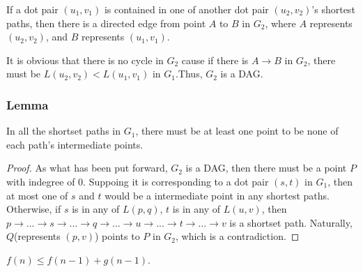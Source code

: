 \documentclass{elegantpaper}
\begin{document}
If a dot pair $(u_{1},v_{1})$ is contained in one of another dot pair $(u_{2},v_{2})$'s shortest paths, then there is a directed edge from point $A$ to $B$ in $G_{2}$, where $A$ represents $(u_{2},v_{2})$, and $B$ represents $(u_{1}, v_{1})$.

It is obvious that there is no cycle in $G_{2}$ cause if there is $A\rightarrow B$ in $G_{2}$, there must be $L(u_{2}, v_{2}) < L(u_{1}, v_{1})$ in $G_{1}$.Thus, $G_{2}$ is a DAG. 

\subsubsection{Lemma}
\begin{lemma} \quad In all the shortset paths in $G_{1}$, there must be at least one point to be none of each path's intermediate points.
\end{lemma}

\begin{proof} \quad As what has been put forward, $G_{2}$ is a DAG, then there must be a point $P$ with indegree of $0$. Suppoing it is corresponding to a dot pair $(s,t)$ in $G_{1}$, then at most one of $s$ and $t$ would be a intermediate point in any shortest paths. Otherwise, if $s$ is in any of $L(p,q)$, $t$ is in any of $L(u,v)$, then $p\rightarrow...\rightarrow s\rightarrow...\rightarrow q\rightarrow...\rightarrow u\rightarrow...\rightarrow t\rightarrow...\rightarrow v$ is a shortset path. Naturally, $Q$(represents $(p,v)$) points to $P$ in $G_{2}$, which is a contradiction.
\end{proof}

\begin{lemma} \quad $f(n)\leq f(n-1)+g(n-1)$.
\end{lemma}
\end{document}
